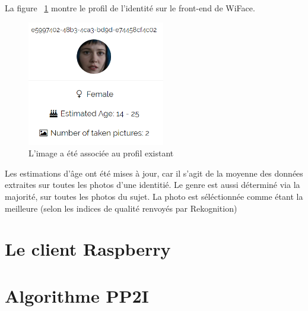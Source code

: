 La figure ~\ref{fig:ramona_profile} montre le profil de l'identité sur le front-end de WiFace.
\begin{figure}[H]
	\centering
	\includegraphics[width=6cm]{images/facial_reco/ramona_profile.png}
    \caption{L'image a été associée au profil existant}
	\label{fig:ramona_profile}
\end{figure}

Les estimations d'âge ont été mises à jour, car il s'agit de la moyenne des données extraites sur toutes les photos d'une identitié.
Le genre est aussi déterminé via la majorité, sur toutes les photos du sujet. 
La photo est séléctionnée comme étant la meilleure (selon les indices de qualité renvoyés par Rekognition)
\section{Le client Raspberry}

\section{Algorithme PP2I}